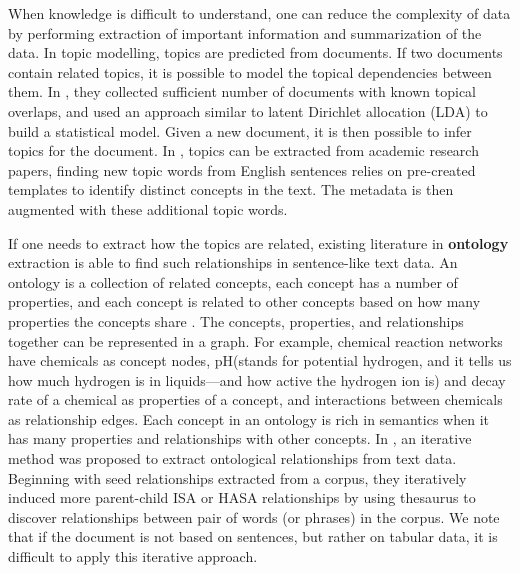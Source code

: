 When knowledge is difficult to understand, one can reduce the complexity of data by performing extraction of important information and summarization of the data. In topic modelling, topics are predicted from documents. If two documents contain related topics, it is possible to model the topical dependencies between them. In \cite{Zolaktaf2012Modeling}, they collected sufficient number of documents with known topical overlaps, and used an approach similar to latent Dirichlet allocation (LDA) to build a statistical model. Given a new document, it is then possible to infer topics for the document. In \cite{Nargesian2018Table}, topics can be extracted from academic research papers, finding new topic words from English sentences relies on pre-created templates to identify distinct concepts in the text. The metadata is then augmented with these additional topic words.

If one needs to extract how the topics are related, existing literature in \textbf{\gls{ontology}} extraction is able to find such relationships in sentence-like text data. An ontology is a collection of related concepts, each concept has a number of properties, and each concept is related to other concepts based on how many properties the concepts share \cite{cruz2005role}. The concepts, properties, and relationships together can be represented in a graph. For example, chemical reaction networks have chemicals as concept nodes, pH(stands for potential hydrogen, and it tells us how much hydrogen is in liquids—and how active the hydrogen ion is) and decay rate of a chemical as properties of a concept, and interactions between chemicals as relationship edges. Each concept in an ontology is rich in semantics when it has many properties and relationships with other concepts. In \cite{10.1145/2396761.2398468}, an iterative method was proposed to extract ontological relationships from text data. Beginning with seed relationships extracted from a corpus, they iteratively induced more parent-child ISA or HASA relationships by using thesaurus to discover relationships between pair of words (or phrases) in the corpus. We note that if the document is not based on sentences, but rather on tabular data, it is difficult to apply this iterative approach.

